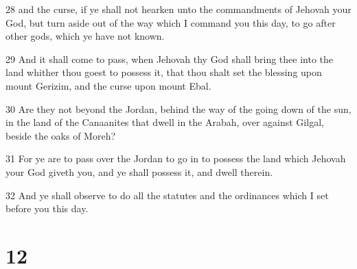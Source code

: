 \par 28 and the curse, if ye shall not hearken unto the commandments of Jehovah your God, but turn aside out of the way which I command you this day, to go after other gods, which ye have not known.
\par 29 And it shall come to pass, when Jehovah thy God shall bring thee into the land whither thou goest to possess it, that thou shalt set the blessing upon mount Gerizim, and the curse upon mount Ebal.
\par 30 Are they not beyond the Jordan, behind the way of the going down of the sun, in the land of the Canaanites that dwell in the Arabah, over against Gilgal, beside the oaks of Moreh?
\par 31 For ye are to pass over the Jordan to go in to possess the land which Jehovah your God giveth you, and ye shall possess it, and dwell therein.
\par 32 And ye shall observe to do all the statutes and the ordinances which I set before you this day.

\chapter{12}

